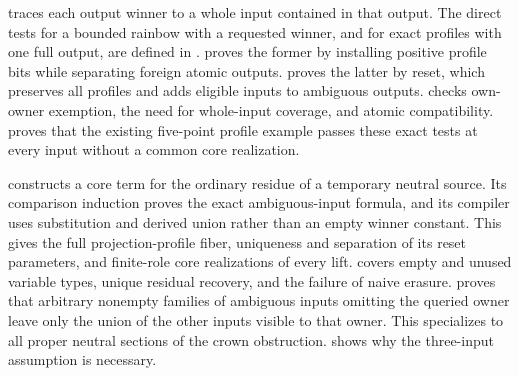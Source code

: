  traces each output winner to a whole
input contained in that output. The direct tests for a bounded rainbow
with a requested winner, and for exact profiles with one full output,
are defined in .
 proves the former by installing
positive profile bits while separating foreign atomic outputs.
 proves the latter by reset,
which preserves all profiles and adds eligible inputs to ambiguous outputs.
 checks own-owner exemption, the need
for whole-input coverage, and atomic compatibility.
 proves that the existing
five-point profile example passes these exact tests at every input
without a common core realization.

 constructs a core term for the
ordinary residue of a temporary neutral source. Its comparison induction
proves the exact ambiguous-input formula, and its compiler uses substitution
and derived union rather than an empty winner constant. This gives the
full projection-profile fiber, uniqueness and separation of its reset
parameters, and finite-role core realizations of every lift.
 covers empty and unused variable
types, unique residual recovery, and the failure of naive erasure.
 proves that arbitrary nonempty
families of ambiguous inputs omitting the queried owner leave only the
union of the other inputs visible to that owner. This specializes to all
proper neutral sections of the crown obstruction.
 shows why the three-input assumption
is necessary.


